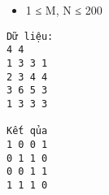 \begin{itemize}
	\item     1 ≤ M, N ≤ 200   
\end{itemize}
\begin{verbatim}
Dữ liệu:
4 4
1 3 3 1
2 3 4 4
3 6 5 3
1 3 3 3

Kết qủa
1 0 0 1
0 1 1 0
0 0 1 1
1 1 1 0
\end{verbatim}